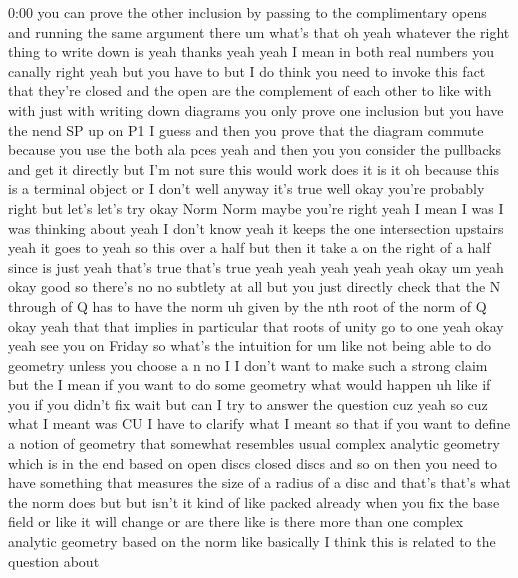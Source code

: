 \begin{unfinished}{0:00}
you  can  prove  the  other  inclusion  by
passing  to  the  complimentary  opens  and
running  the  same  argument  there
um  what's
that  oh  yeah  whatever  the  right  thing  to
write  down  is  yeah  thanks  yeah
yeah  I  mean  in  both  real  numbers  you
canally  right  yeah  but  you  have
to  but  I  do  think  you  need  to  invoke
this  fact  that  they're  closed  and  the
open  are  the  complement  of  each  other
to  like  with  with  just  with  writing  down
diagrams  you  only  prove  one  inclusion
but  you  have  the  nend  SP  up  on  P1  I
guess  and  then  you  prove  that  the
diagram  commute  because  you  use  the  both
ala  pces  yeah  and  then  you  you  consider
the  pullbacks  and  get  it  directly  but
I'm  not  sure  this  would
work  does  it  is  it
oh  because  this  is  a  terminal  object  or
I
don't  well  anyway  it's
true  well  okay  you're  probably  right  but
let's  let's
try
okay  Norm
Norm  maybe  you're  right  yeah  I  mean  I
was  I  was  thinking  about  yeah  I  don't
know
yeah  it  keeps  the  one  intersection
upstairs  yeah  it  goes  to
yeah  so  this  over  a
half  but  then  it  take  a  on  the  right  of
a  half  since  is  just  yeah  that's  true
that's  true  yeah  yeah  yeah  yeah  yeah
okay  um  yeah  okay  good  so  there's  no  no
subtlety  at  all  but  you  just  directly
check  that  the  N  through  of  Q  has  to
have  the
norm  uh  given  by  the  nth  root  of  the
norm  of  Q
okay  yeah  that  that  implies  in
particular  that  roots  of  unity  go  to  one
yeah
okay  yeah  see  you  on
Friday
so  what's  the  intuition
for
um  like  not  being  able  to  do  geometry
unless  you  choose  a  n  no  I  I  don't  want
to  make  such  a  strong  claim  but  the  I
mean  if  you  want  to  do  some  geometry
what  would  happen  uh  like  if  you  if  you
didn't  fix  wait  but  can  I  try  to  answer
the  question  cuz  yeah  so  cuz  what  I
meant  was  CU  I  have  to  clarify  what  I
meant  so  that  if  you  want  to  define  a
notion  of  geometry  that  somewhat
resembles  usual  complex  analytic
geometry  which  is  in  the  end  based  on
open  discs  closed  discs  and  so  on  then
you  need  to  have  something  that  measures
the  size  of  a  radius  of  a  disc  and
that's  that's  what  the  norm  does  but  but
isn't  it  kind  of  like  packed  already
when  you  fix  the  base  field  or  like  it
will  change  or  are  there  like  is  there
more  than  one  complex  analytic  geometry
based  on  the  norm  like  basically  I  think
this  is  related  to  the  question  about

\end{unfinished}
